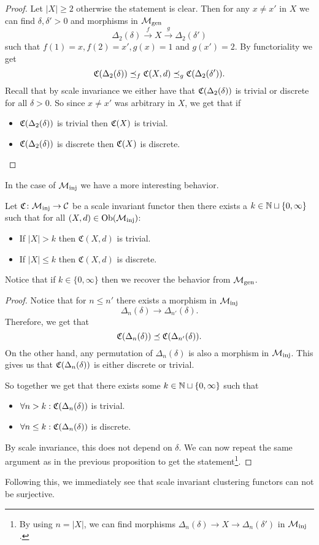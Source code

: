 \begin{proof}
    Let $|X| \ge 2$ otherwise the statement is clear.
    Then for any $x \neq x'$ in $X$ we can find $\delta, \delta' > 0$ and morphisms in ${\mathcal{M}_\mathrm{gen}}$
    $$
    \Delta_2(\delta) \overset{f}\longrightarrow X \overset{g}\longrightarrow \Delta_2(\delta')
    $$
    such that $f(1) = x, f(2) = x', g(x) = 1$ and $g(x') = 2$. By functoriality we get
    $$
    \mathfrak{C}(\Delta_2(\delta)) \preceq_f \mathfrak{C}(X,d) \preceq_g \mathfrak{C}(\Delta_2(\delta')).
    $$
    Recall that by scale invariance we either have that $\mathfrak{C}(\Delta_2(\delta))$ is trivial or discrete for all $\delta > 0$.
    So since $x \neq x'$ was arbitrary in $X$, we get that if
    \begin{itemize}
        \item $\mathfrak{C}(\Delta_2(\delta))$ is trivial then $\mathfrak{C}(X)$ is trivial.
        \item $\mathfrak{C}(\Delta_2(\delta))$ is discrete then $\mathfrak{C}(X)$ is discrete.
    \end{itemize}
\end{proof}
In the case of ${\mathcal{M}_\mathrm{inj}}$ we have a more interesting behavior.
\begin{proposition}{\cite[Thm.~6.6]{Carlsson2010}}{}
    Let $\mathfrak{C}\colon {\mathcal{M}_\mathrm{inj}} \to \mathcal{C}$ be a scale invariant functor then there exists a $k \in \mathbb N \sqcup \{0, \infty\}$ such that for all $(X,d) \in \mathrm {Ob}({\mathcal{M}_\mathrm{inj}})$:

    \begin{itemize}
        \item If $|X| > k$ then $\mathfrak{C}(X,d)$ is trivial.
        \item If $|X| \le k$ then $\mathfrak{C}(X,d)$ is discrete.
    \end{itemize}

    Notice that if $k \in \{0, \infty\}$ then we recover the behavior from ${\mathcal{M}_\mathrm{gen}}$.
\end{proposition}

\begin{proof}   
    Notice that for $n \le n'$ there exists a morphism in ${\mathcal{M}_\mathrm{inj}}$
    $$
    \Delta_n(\delta) \longrightarrow \Delta_{n'}(\delta).
    $$
    Therefore, we get that
    $$
    \mathfrak{C}(\Delta_n(\delta)) \preceq \mathfrak{C}(\Delta_{n'}(\delta)).
    $$
    On the other hand, any permutation of $\Delta_n(\delta)$ is also a morphism in ${\mathcal{M}_\mathrm{inj}}$. This gives us that $\mathfrak{C}(\Delta_n(\delta))$ is either discrete or trivial.

    So together we get that there exists some $k \in \mathbb N \sqcup \{0, \infty\}$ such that
    \begin{itemize}
        \item $\forall n > k: \mathfrak{C}(\Delta_n(\delta))$ is trivial.
        \item $\forall n \le k: \mathfrak{C}(\Delta_n(\delta))$ is discrete.
    \end{itemize}
    By scale invariance, this does not depend on $\delta$. We can now repeat the same argument as in the previous proposition to get the statement\footnote{By using $n = |X|$, we can find morphisms $\Delta_n(\delta) \to X \to \Delta_n(\delta')$ in ${\mathcal{M}_\mathrm{inj}}$.}.
\end{proof}

Following this, we immediately see that scale invariant clustering functors can not be surjective.
